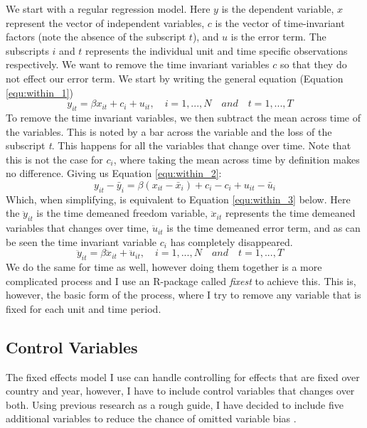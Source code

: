 We start with a regular regression model. Here $y$ is the dependent variable, $x$ represent the vector of independent variables, $c$ is the vector of time-invariant factors (note the absence of the subscript $t$), and $u$ is the error term. The subscripts $i$ and $t$ represents the individual unit and time specific observations respectively. We want to remove the time invariant variables $c$ so that they do not effect our error term. We start by writing the general equation (Equation \ref{equ:within_1})
\begin{equation}
    y_{it} = \beta x_{it} + c_i + u_{it}, \quad i = 1,..., N \quad and \quad  t = 1,..., T  \quad
\label{equ:within_1}
\end{equation} 
To remove the time invariant variables, we then subtract the mean across time of the variables. This is noted by a bar across the variable and the loss of the subscript \textit{t}. This happens for all the variables that change over time. Note that this is not the case for $c_i$, where taking the mean across time by definition makes no difference. Giving us Equation \ref{equ:within_2}:
\begin{equation}
    y_{it} - \bar{y}_i = \beta (x_{it} - \bar{x}_i) + c_i - c_i + u_{it} - \bar{u}_i
\label{equ:within_2}
\end{equation}
Which, when simplifying, is equivalent to Equation \ref{equ:within_3} below. Here the $\ddot{y}_{it}$ is the time demeaned freedom variable, $\ddot{x}_{it}$ represents the time demeaned variables that changes over time, $\ddot{u}_{it}$ is the time demeaned error term, and as can be seen the time invariant variable $c_i$ has completely disappeared. 
\begin{equation}
    \ddot{y}_{it} = \beta \ddot{x}_{it} + \ddot{u}_{it}, \quad i = 1,..., N \quad and \quad  t = 1,..., T  \quad 
\label{equ:within_3}
\end{equation}
We do the same for time as well, however doing them together is a more complicated process and I use an R-package called \textit{fixest} \citep{berge_efficient_2018} to achieve this. This is, however, the basic form of the process, where I try to remove any variable that is fixed for each unit and time period.

\subsection{Control Variables} \label{control}
The fixed effects model I use can handle controlling for effects that are fixed over country and year, however, I have to include control variables that changes over both. Using previous research \citep{gamso_is_2021, toettoe_foreign_2023} as a rough guide, I have decided to include five additional variables to reduce the chance of omitted variable bias \citep[pp. 81-85]{wooldridge_econometric_2010}.

